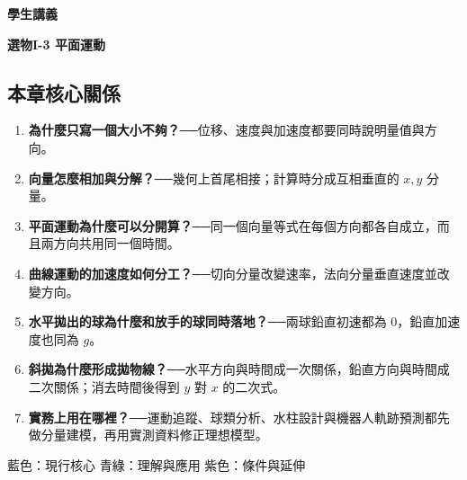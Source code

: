 \documentclass[11pt,a4paper]{article}
\providecommand{\tightlist}{%
  \setlength{\itemsep}{0pt}\setlength{\parskip}{0pt}}
\begin{document}
\begin{tcolorbox}[
  enhanced,colback=white,colframe=HandoutBlue,boxrule=1.1pt,arc=2mm,
  borderline west={3pt}{0pt}{HandoutBlue},left=5mm,right=4mm,top=4mm,bottom=4mm
]
{\sffamily\small\bfseries\color{HandoutBlue}學生講義}\par
{\sffamily\bfseries\LARGE\color{HandoutInk}選物I-3 平面運動}\par
\vspace{0.35em}{\large 把斜著飛的運動拆成兩條直線，就能看懂整條軌跡}\par
{}\par
{}\par
\end{tcolorbox}


\begin{HandoutLearningMap}

\subsection{本章核心關係}\label{ux672cux7ae0ux6838ux5fc3ux95dcux4fc2}

\begin{enumerate}
\def\labelenumi{\arabic{enumi}.}
\tightlist
\item
  \textbf{為什麼只寫一個大小不夠？}──位移、速度與加速度都要同時說明量值與方向。
\item
  \textbf{向量怎麼相加與分解？}──幾何上首尾相接；計算時分成互相垂直的 \(x,y\) 分量。
\item
  \textbf{平面運動為什麼可以分開算？}──同一個向量等式在每個方向都各自成立，而且兩方向共用同一個時間。
\item
  \textbf{曲線運動的加速度如何分工？}──切向分量改變速率，法向分量垂直速度並改變方向。
\item
  \textbf{水平拋出的球為什麼和放手的球同時落地？}──兩球鉛直初速都為 0，鉛直加速度也同為 \(g\)。
\item
  \textbf{斜拋為什麼形成拋物線？}──水平方向與時間成一次關係，鉛直方向與時間成二次關係；消去時間後得到 \(y\) 對 \(x\) 的二次式。
\item
  \textbf{實務上用在哪裡？}──運動追蹤、球類分析、水柱設計與機器人軌跡預測都先做分量建模，再用實測資料修正理想模型。
\end{enumerate}

{藍色：現行核心}
{青綠：理解與應用}
{紫色：條件與延伸}

\end{HandoutLearningMap}
\end{document}
